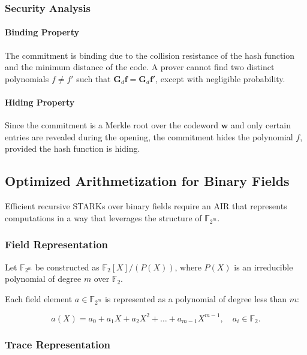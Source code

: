 \documentclass{article}
\theoremstyle{plain}
\theoremstyle{definition}
\theoremstyle{remark}
\theoremstyle{problem}
\begin{document}
\subsubsection{Security Analysis}

\paragraph{Binding Property}

The commitment is binding due to the collision resistance of the hash function and the minimum distance of the code. A prover cannot find two distinct polynomials $f \neq f'$ such that $\mathbf{G}_d \mathbf{f} = \mathbf{G}_d \mathbf{f}'$, except with negligible probability.

\paragraph{Hiding Property}

Since the commitment is a Merkle root over the codeword $\mathbf{w}$ and only certain entries are revealed during the opening, the commitment hides the polynomial $f$, provided the hash function is hiding.

\subsection{Optimized Arithmetization for Binary Fields}

Efficient recursive STARKs over binary fields require an AIR that represents computations in a way that leverages the structure of $\mathbb{F}_{2^m}$.

\subsubsection{Field Representation}

Let $\mathbb{F}_{2^m}$ be constructed as $\mathbb{F}_2[X]/(P(X))$, where $P(X)$ is an irreducible polynomial of degree $m$ over $\mathbb{F}_2$.

Each field element $a \in \mathbb{F}_{2^m}$ is represented as a polynomial of degree less than $m$:

\[
a(X) = a_0 + a_1 X + a_2 X^2 + \dots + a_{m-1} X^{m-1}, \quad a_i \in \mathbb{F}_2.
\]

\subsubsection{Trace Representation}
\end{document}
